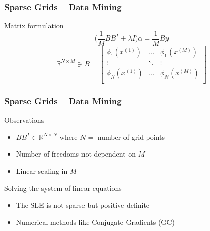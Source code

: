 \begin{frame}
  \frametitle{Sparse Grids -- Data Mining}
  \topline
  \vspace{-10px}
  \begin{block}{Matrix formulation}
    $$\big(\frac{1}{M} BB^T + \lambda I \big)\alpha = \frac{1}{M}By$$
    \vspace{15px}
    \[ \mathbb{R}^{N\times M} \ni B =
      \begin{bmatrix}
        \phi_1(x^{(1)}) & \dots & \phi_1(x^{(M)}) \\
        \vdots & \ddots & \vdots \\
        \phi_N(x^{(1)}) & \dots  & \phi_N(x^{(M)}) \\
      \end{bmatrix}
    \]
  \end{block}
\end{frame}


\begin{frame}
  \frametitle{Sparse Grids -- Data Mining}
  \topline
  \vspace{-10px}
  \begin{block}{Observations}
    \begin{itemize}
    \item $ BB^T \in \mathbb{R}^{N \times N}$ where $N =$ number of grid points
    \item Number of freedoms not dependent on $M$
    \item Linear scaling in $M$
    \end{itemize}
  \end{block}
  \begin{block}{Solving the system of linear equations}
    \begin{itemize}
    \item The SLE is not sparse but positive definite
    \item Numerical methods like Conjugate Gradients (GC)
    \end{itemize}
  \end{block}

\end{frame}

